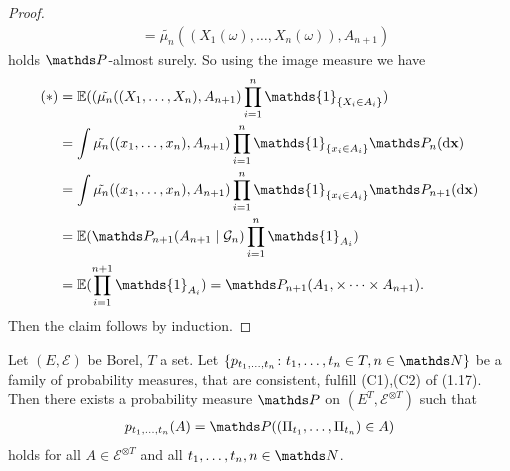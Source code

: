 \begin{proof}
\begin{align*}
&=\tilde{\mu_n}((X_1(\omega),\dots,X_n(\omega)),A_{n+1})
\end{align*}
holds $\Prob$-almost surely.
So using the image measure we have
\begin{align*}
(\ast)&=\E{(\tilde{\mu_n}((X_1,\dots,X_n),A_{n+1})\prod_{i=1}^n \mathds{1}_{\{X_i \in A_i\}}}\\
&=\int \tilde{\mu_n}((x_1,\dots,x_n),A_{n+1})\prod_{i=1}^n \mathds{1}_{\{x_i \in A_i\}}\Prob_n(\mathrm{d}\textbf{x})\\
&=\int \tilde{\mu_n}((x_1,\dots,x_n),A_{n+1})\prod_{i=1}^n \mathds{1}_{\{x_i \in A_i\}} \Prob_{n+1}(\mathrm{d}\textbf{x})\\
&=\E{\Prob_{n+1}(A_{n+1}\mid \mathcal{G}_n)\prod_{i=1}^n \mathds{1}_{A_i}}\\
&=\E{\prod_{i=1}^{n+1} \mathds{1}_{A_i}}=\Prob_{n+1}(A_1,\times \dots \times A_{n+1}).
\end{align*}
Then the claim follows by induction.
\end{proof}

\begin{thm}[Kolmogorov 1932]
Let $(E,\mathcal{E})$ be Borel, $T$ a set. Let $\{p_{t_1,\dots,t_n} \colon t_1,\dots,t_n \in T,n \in \N\}$ be a family
of probability measures, that are consistent, \ie fulfill (C1),(C2) of (1.17).
Then there exists a probability measure $\Prob$ on $(E^T,\mathcal{E}^{\otimes T})$ such that
\begin{align*}
p_{t_1,\dots,t_n}(A)=\Prob((\Pi_{t_1},\dots,\Pi_{t_n})\in A)
\end{align*}
holds for all $A\in \mathcal{E}^{\otimes T}$ and all $t_1,\dots,t_n, n\in \N$.
\end{thm}

